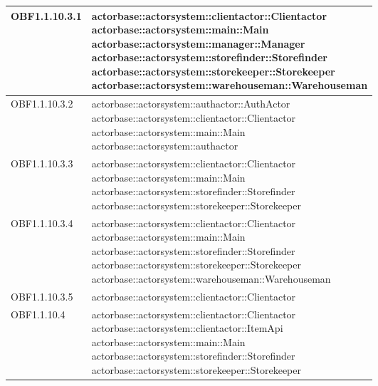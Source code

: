 \documentclass{scalatekids-article}
\begin{document}
\begin{longtable}[H]{|p{5cm}|p{12cm}|}
\hline
OBF1.1.10.3.1 & \multiLineCell[t]{actorbase::actorsystem::clientactor::Clientactor\\actorbase::actorsystem::main::Main\\actorbase::actorsystem::manager::Manager\\actorbase::actorsystem::storefinder::Storefinder\\actorbase::actorsystem::storekeeper::Storekeeper\\actorbase::actorsystem::warehouseman::Warehouseman\\}\\
\hline
OBF1.1.10.3.2 & \multiLineCell[t]{actorbase::actorsystem::authactor::AuthActor\\actorbase::actorsystem::clientactor::Clientactor\\actorbase::actorsystem::main::Main\\actorbase::actorsystem::authactor\\}\\
\hline
OBF1.1.10.3.3 & \multiLineCell[t]{actorbase::actorsystem::clientactor::Clientactor\\actorbase::actorsystem::main::Main\\actorbase::actorsystem::storefinder::Storefinder\\actorbase::actorsystem::storekeeper::Storekeeper\\}\\
\hline
OBF1.1.10.3.4 & \multiLineCell[t]{actorbase::actorsystem::clientactor::Clientactor\\actorbase::actorsystem::main::Main\\actorbase::actorsystem::storefinder::Storefinder\\actorbase::actorsystem::storekeeper::Storekeeper\\actorbase::actorsystem::warehouseman::Warehouseman\\}\\
\hline
OBF1.1.10.3.5 & \multiLineCell[t]{actorbase::actorsystem::clientactor::Clientactor\\}\\
\hline
OBF1.1.10.4 & \multiLineCell[t]{actorbase::actorsystem::clientactor::Clientactor\\actorbase::actorsystem::clientactor::ItemApi\\actorbase::actorsystem::main::Main\\actorbase::actorsystem::storefinder::Storefinder\\actorbase::actorsystem::storekeeper::Storekeeper\\}\\

\end{longtable}
\end{document}
